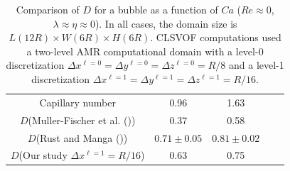 \documentclass[%
 reprint,
 showkeys,
 amsmath,amssymb,
 aps,
 prfluids,
 onecolumn
]{revtex4-2}
\newcommand{\lwh}[3]{L(#1R)\times W(#2R) \times H(#3R)}
\begin{document}
\begin{table}[tbh]
{\color{blue}
\caption{Comparison of  {\color{red} $D$} for a bubble as a function 
         of $Ca$ ($Re \approx 0$, $\lambda \approx \eta \approx 0$). 
	 In all cases, the domain 
         size is $\lwh{12}{6}{6}$.
         CLSVOF computations used a two-level AMR computational domain 
         with a level-0 discretization $\Delta x^{\ell=0} = \Delta y^{\ell=0} 
         = \Delta z^{\ell=0} = R/8$ and a level-1 discretization
         $\Delta x^{\ell=1} = \Delta y^{\ell=1} = \Delta z^{\ell=1} = R/16$.}
 }
\label{tab:DeComparisonRe=0}
\center
\begin{tabular}{ c  c  c  c  c }
\hline
\hline
Capillary number & 0.96  & 1.63  \\
{$D$}(Muller-Fischer et al. (\cite{MulTobDreFisWin08}))   & 0.37   &   0.58     \\
{$D$}(Rust and Manga (\cite{RusMan02}))    & $0.71\pm 0.05$   &   $0.81\pm 0.02$     \\
{$D$}(Our study $\Delta x^{\ell=1}=R/16$)  & 0.63   &   0.75     \\
\hline
\hline
\end{tabular}
\end{table}
\end{document}
